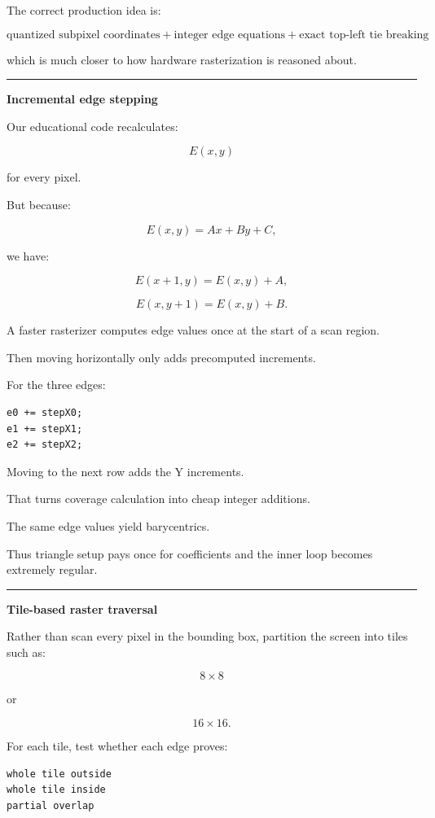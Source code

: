 The correct production idea is:

\[
\boxed{
\text{quantized subpixel coordinates}
+
\text{integer edge equations}
+
\text{exact top-left tie breaking}
}
\]

which is much closer to how hardware rasterization is reasoned about.

\begin{center}\rule{0.5\linewidth}{0.5pt}\end{center}

\textbf{Incremental edge stepping}

Our educational code recalculates:

\[
E(x,y)
\]

for every pixel.

But because:

\[
E(x,y)=Ax+By+C,
\]

we have:

\[
E(x+1,y)=E(x,y)+A,
\]

\[
E(x,y+1)=E(x,y)+B.
\]

A faster rasterizer computes edge values once at the start of a scan region.

Then moving horizontally only adds precomputed increments.

For the three edges:

\begin{verbatim}
e0 += stepX0;
e1 += stepX1;
e2 += stepX2;
\end{verbatim}

Moving to the next row adds the Y increments.

That turns coverage calculation into cheap integer additions.

The same edge values yield barycentrics.

Thus triangle setup pays once for coefficients and the inner loop becomes extremely regular.

\begin{center}\rule{0.5\linewidth}{0.5pt}\end{center}

\textbf{Tile-based raster traversal}

Rather than scan every pixel in the bounding box, partition the screen into tiles such as:

\[
8\times8
\]

or

\[
16\times16.
\]

For each tile, test whether each edge proves:

\begin{verbatim}
whole tile outside
whole tile inside
partial overlap
\end{verbatim}

